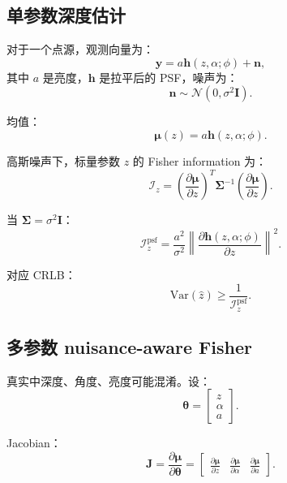 \documentclass[11pt,a4paper,fontset=none]{ctexart}
\begin{document}
\subsection{单参数深度估计}

对于一个点源，观测向量为：
\begin{equation}
  \bm y=
  a\bm h(z,\alpha;\phi)+\bm n,
\end{equation}
其中 $a$ 是亮度，$\bm h$ 是拉平后的 PSF，噪声为：
\begin{equation}
  \bm n\sim\mathcal N(0,\sigma^2\bm I).
\end{equation}

均值：
\begin{equation}
  \bm\mu(z)=a\bm h(z,\alpha;\phi).
\end{equation}

高斯噪声下，标量参数 $z$ 的 Fisher information 为：
\begin{equation}
  \mathcal I_z
  =
  \left(\frac{\partial\bm\mu}{\partial z}\right)^T
  \bm\Sigma^{-1}
  \left(\frac{\partial\bm\mu}{\partial z}\right).
\end{equation}

当 $\bm\Sigma=\sigma^2\bm I$：
\begin{equation}
\boxed{
  \mathcal I_z^{\mathrm{psf}}
  =
  \frac{a^2}{\sigma^2}
  \left\|
  \frac{\partial\bm h(z,\alpha;\phi)}{\partial z}
  \right\|^2 .
}
\end{equation}

对应 CRLB：
\begin{equation}
  \mathrm{Var}(\hat z)\ge
  \frac{1}{\mathcal I_z^{\mathrm{psf}}}.
\end{equation}

\subsection{多参数 nuisance-aware Fisher}

真实中深度、角度、亮度可能混淆。设：
\begin{equation}
  \bm\theta=
  \begin{bmatrix}
  z\\
  \alpha\\
  a
  \end{bmatrix}.
\end{equation}

Jacobian：
\begin{equation}
  \bm J=
  \frac{\partial\bm\mu}{\partial\bm\theta}
  =
  \begin{bmatrix}
  \frac{\partial\bm\mu}{\partial z}&
  \frac{\partial\bm\mu}{\partial\alpha}&
  \frac{\partial\bm\mu}{\partial a}
  \end{bmatrix}.
\end{equation}
\end{document}
